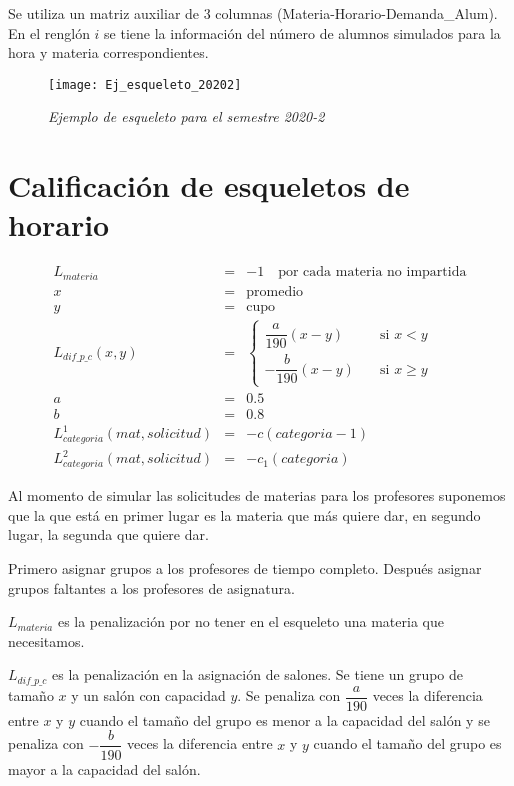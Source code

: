 Se utiliza un matriz auxiliar de 3 columnas (Materia-Horario-Demanda\_Alum). En el renglón $i$ se tiene la información del número de alumnos simulados para la hora y materia correspondientes.

\begin{figure}[H]
\centering
\texttt{[image: Ej\_esqueleto\_20202]} %
\caption{\textit{Ejemplo de esqueleto para el semestre 2020-2}}\label{esqueleto20202}
\end{figure}

\section{Calificación de esqueletos de horario}

\begin{eqnarray*}
L_{materia} &=& -1 \,\,\,\,\,\,  \text{por cada materia no impartida}\\
x &=& \text{promedio}\\
y &=& \text{cupo}\\
L_{dif\_p\_c} (x,y) &=& \begin{cases}
    \dfrac{a}{190} (x-y)  & \quad \text{si } x<y\\
    - \dfrac{b}{190} (x-y)  & \quad \text{si } x\geqslant y
  \end{cases}\\
a &=& 0.5\\
b &=& 0.8\\
L_{categoria}^{1} (mat,solicitud) &=& -c(categoria - 1)\\
L_{categoria}^{2} (mat,solicitud) &=& -c_{1}(categoria)
\end{eqnarray*}

Al momento de simular las solicitudes de materias para los profesores suponemos que la que está en primer lugar es la materia que más quiere dar, en segundo lugar, la segunda que quiere dar.

Primero asignar grupos a los profesores de tiempo completo. Después asignar grupos faltantes a los profesores de asignatura.

$L_{materia}$ es la penalización por no tener en el esqueleto una materia que necesitamos.

$L_{dif\_p\_c}$ es la penalización en la asignación de salones. Se tiene un grupo de tamaño $x$ y un salón con capacidad $y$. Se penaliza con $\dfrac{a}{190}$ veces la diferencia entre $x$ y $y$ cuando el tamaño del grupo es menor a la capacidad del salón y se penaliza con $-\dfrac{b}{190}$ veces la diferencia entre $x$ y $y$ cuando el tamaño del grupo es mayor a la capacidad del salón.

